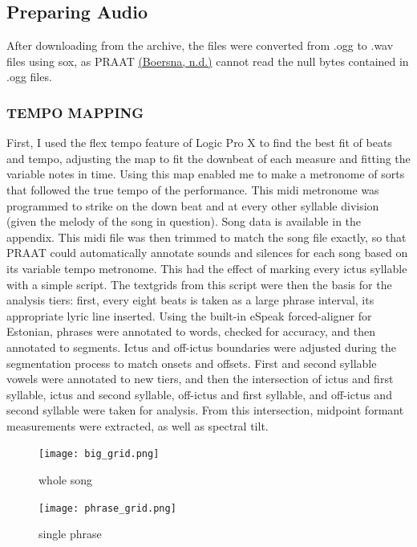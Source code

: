 \documentclass[11pt]{article}
\begin{document}



\subsection*{Preparing Audio} 
After downloading from the archive, the files were converted from .ogg to .wav files  using sox, as PRAAT\cite{PRAAT} \hyperref[csl:2]{(Boersna, n.d.)} cannot read the null bytes contained in .ogg files. \\
\subsubsection{TEMPO MAPPING}
First, I used the flex tempo feature of Logic Pro X to find the best fit of beats and tempo, adjusting the map to fit the downbeat of each measure and fitting the variable notes in time. Using this map enabled me to make a metronome of sorts that followed the true tempo of the performance. This midi metronome was programmed to strike on the down beat and at every other syllable division (given the melody of the song in question). Song data is available in the appendix. This midi file was then trimmed to match the song file exactly, so that PRAAT could automatically annotate sounds and silences for each song based on its variable tempo metronome. This had the effect of marking every ictus syllable with a simple script. The textgrids from this script were then the basis for the analysis tiers: first, every eight beats is taken as a large phrase interval, its appropriate lyric line inserted. Using the built-in eSpeak forced-aligner for Estonian, phrases were annotated to words, checked for accuracy, and then annotated to segments. Ictus and off-ictus boundaries were adjusted during the segmentation process to match onsets and offsets. First and second syllable vowels were annotated to new tiers, and then the intersection of ictus and first syllable, ictus and second syllable, off-ictus and first syllable, and off-ictus and second syllable were taken for analysis. From this intersection, midpoint formant measurements were extracted, as well as spectral tilt. 



\begin{figure}[htbp]
		\begin{center}
			\texttt{[image: big\_grid.png]}
			
			\caption{whole song}
			\label{song_whole}
		\end{center}
	\end{figure}
		\begin{figure}[htbp]
\begin{center}
			\texttt{[image: phrase\_grid.png]}
			\caption{single phrase}
\label{phrase}
\end{center}
\end{figure}
\end{document}
